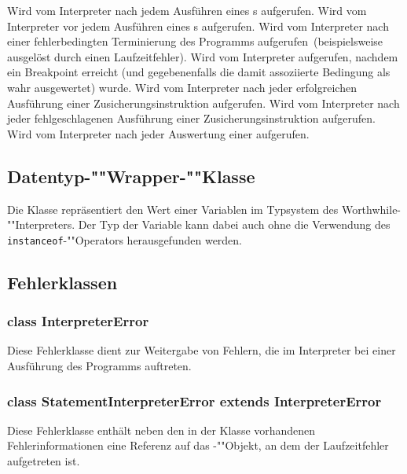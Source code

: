 \begin{description}
    Wird vom Interpreter nach jedem Ausführen eines s aufgerufen.
    Wird vom Interpreter vor jedem Ausführen eines s aufgerufen.
    Wird vom Interpreter nach einer fehlerbedingten Terminierung des Programms aufgerufen~(beispielsweise ausgelöst durch einen Laufzeitfehler).
    Wird vom Interpreter aufgerufen, nachdem ein Breakpoint erreicht (und gegebenenfalls die damit assoziierte Bedingung als wahr ausgewertet) wurde.
    Wird vom Interpreter nach jeder erfolgreichen Ausführung einer Zusicherungsinstruktion aufgerufen.
    Wird vom Interpreter nach jeder fehlgeschlagenen Ausführung einer Zusicherungsinstruktion aufgerufen.
    Wird vom Interpreter nach jeder Auswertung einer  aufgerufen.
\end{description}

\subsection{Datentyp-""Wrapper-""Klasse }
Die Klasse  repräsentiert den Wert einer Variablen im Typsystem des Worthwhile-""Interpreters. Der Typ der Variable kann dabei auch ohne die Verwendung des \texttt{instanceof}-""Operators herausgefunden werden.

\subsection{Fehlerklassen}
\subsubsection{class InterpreterError}
Diese Fehlerklasse dient zur Weitergabe von Fehlern, die im Interpreter bei einer Ausführung des Programms auftreten.

\subsubsection{class StatementInterpreterError extends InterpreterError}
Diese Fehlerklasse enthält neben den in der Klasse  vorhandenen Fehlerinformationen eine Referenz auf das -""Objekt, an dem der Laufzeitfehler aufgetreten ist.

